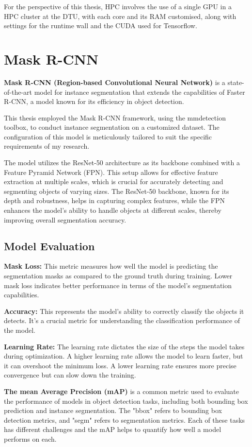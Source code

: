 For the perspective of this thesis, HPC involves the use of a single GPU in a HPC cluster at the DTU, with each core and its RAM customised, along with settings for the runtime wall and the CUDA used for Tensorflow.
\section{Mask R-CNN}
\textbf{Mask R-CNN (Region-based Convolutional Neural Network)} is a state-of-the-art model for instance segmentation that extends the capabilities of Faster R-CNN, a model known for its efficiency in object detection. 

This thesis employed the Mask R-CNN framework, using the mmdetection\cite{mmdetection} toolbox, to conduct instance segmentation on a customized dataset. The configuration of this model is meticulously tailored to suit the specific requirements of my research.

The model utilizes the ResNet-50 architecture as its backbone combined with a Feature Pyramid Network (FPN). This setup allows for effective feature extraction at multiple scales, which is crucial for accurately detecting and segmenting objects of varying sizes. The ResNet-50 backbone, known for its depth and robustness, helps in capturing complex features, while the FPN enhances the model's ability to handle objects at different scales, thereby improving overall segmentation accuracy.

\subsection{Model Evaluation}
\textbf{Mask Loss: }This metric measures how well the model is predicting the segmentation masks as compared to the ground truth during training. Lower mask loss indicates better performance in terms of the model's segmentation capabilities. 

\textbf{Accuracy:} This represents the model's ability to correctly classify the objects it detects. It's a crucial metric for understanding the classification performance of the model. 

\textbf{Learning Rate:} The learning rate dictates the size of the steps the model takes during optimization. A higher learning rate allows the model to learn faster, but it can overshoot the minimum loss. A lower learning rate ensures more precise convergence but can slow down the training.

\textbf{The mean Average Precision (mAP)} is a common metric used to evaluate the performance of models in object detection tasks, including both bounding box prediction and instance segmentation. The "bbox" refers to bounding box detection metrics, and "segm" refers to segmentation metrics. Each of these tasks has different challenges and the mAP helps to quantify how well a model performs on each.

